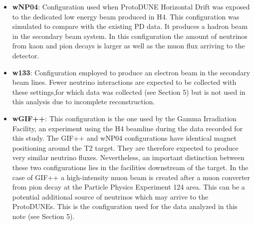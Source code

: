 \begin{itemize}
    \item \textbf{wNP04}: Configuration used when ProtoDUNE Horizontal Drift was exposed to the dedicated low energy beam produced in H4. This configuration was simulated to compare with the existing PD data. It produces a hadron beam in the secondary beam system. In this configuration the amount of neutrinos from kaon and pion decays is larger as well as the muon flux arriving to the detector.  
    \item \textbf{w133}: Configuration employed to produce an electron beam in the secondary beam lines. Fewer neutrino interactions are expected to be collected with these settings,for which data was collected (see Section 5) but is not used in this analysis due to incomplete reconstruction. 
    \item \textbf{wGIF++}: This configuration is the one used by the Gamma Irradiation Facility, an experiment using the H4 beamline during the data recorded for this study. The GIF++ and wNP04 configurations have identical magnet positioning around the T2 target. They are therefore expected to produce very similar neutrino fluxes. Nevertheless, an important distinction between these two configurations lies in the facilities downstream of the target. In the case of GIF++ a high-intensity muon beam is created after a muon converter from pion decay at the Particle Physics Experiment 124 area. This can be a potential additional source of neutrinos which may arrive to the ProtoDUNEs. This is the configuration used for the data analyzed in this note (see Section 5).
\end{itemize}

